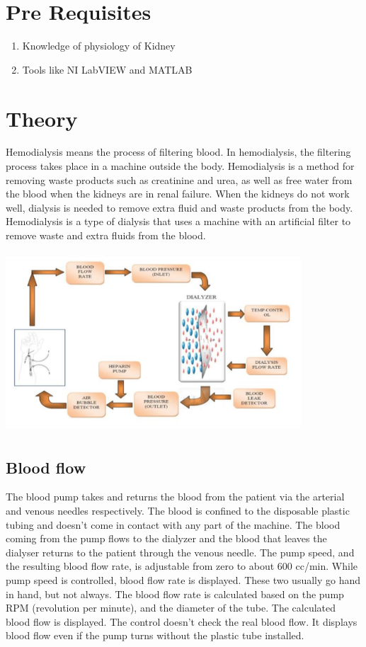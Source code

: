 \documentclass[
  11pt,
  letterpaper,
  DIV=11,
  numbers=noendperiod]{scrreprt}
\providecommand{\tightlist}{%
  \setlength{\itemsep}{0pt}\setlength{\parskip}{0pt}}\usepackage{longtable,booktabs,array}
\begin{document}
\section{Pre Requisites}\label{pre-requisites-4}

\begin{enumerate}
\def\labelenumi{\arabic{enumi}.}
\tightlist
\item
  Knowledge of physiology of Kidney
\item
  Tools like NI LabVIEW and MATLAB
\end{enumerate}

\section{Theory}\label{theory-9}

Hemodialysis means the process of filtering blood. In hemodialysis, the
filtering process takes place in a machine outside the body.
Hemodialysis is a method for removing waste products such as creatinine
and urea, as well as free water from the blood when the kidneys are in
renal failure. When the kidneys do not work well, dialysis is needed to
remove extra fluid and waste products from the body. Hemodialysis is a
type of dialysis that uses a machine with an artificial filter to remove
waste and extra fluids from the blood.

\includegraphics[width=4.34375in,height=2.65625in]{images/clipboard-2703843569.png}

\subsection{Blood flow}\label{blood-flow}

The blood pump takes and returns the blood from the patient via the
arterial and venous needles respectively. The blood is confined to the
disposable plastic tubing and doesn't come in contact with any part of
the machine. The blood coming from the pump flows to the dialyzer and
the blood that leaves the dialyser returns to the patient through the
venous needle. The pump speed, and the resulting blood flow rate, is
adjustable from zero to about 600 cc/min. While pump speed is
controlled, blood flow rate is displayed. These two usually go hand in
hand, but not always. The blood flow rate is calculated based on the
pump RPM (revolution per minute), and the diameter of the tube. The
calculated blood flow is displayed. The control doesn't check the real
blood flow. It displays blood flow even if the pump turns without the
plastic tube installed.
\end{document}
